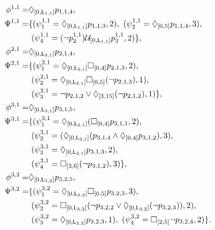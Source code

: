 \documentclass[journal,twoside,web]{IEEEtran}
\newcommand{\Len}{{\sf L}}
\newcommand{\U}[1]{\mathcal{U}_{[#1]}}
\newcommand{\F}[1]{\Diamond_{[#1]}}
\newcommand{\G}[1]{\Box_{[#1]}}
\begin{document}
%
\begin{align}
\phi^{1,1}=&\F{0,\Len_{1,1}}p_{1,1,4},\notag \\
\Psi^{1,1} 
=&\{
(\psi^{1,1}_1 =\F{0,\Len_{1,1}}p_{1,1,3}, 2),~
(\psi^{1,1}_2 =\F{0,5}p_{1,1,4},3),\notag\\
&~(\psi^{1,1}_4 =(\lnot p_2^{1,1}) \U{0,\Len_{1,1}}p_3^{1,1}, 2)
\} ,\notag
\\
%
%
\phi^{2,1}=&\F{0,\Len_{2,1}}p_{2,1,4},\notag \\
\Psi^{2,1} 
=&\{
(\psi^{2,1}_1=\F{0,\Len_{2,1}}\G{0,4}p_{2,1,3},2),\notag \\&~
(\psi^{2,1}_2=\F{0,\Len_{2,1}}\G{0,5}(\lnot p_{2,1,3}),1),\notag\\&~
(\psi^{2,1}_3= \lnot p_{2,1,2} \lor \F{3,15}(\lnot p_{2,1,2}),1)
\},\notag
\\ %
\phi^{3,1}=&\F{0,\Len_{3,1}}p_{3,1,5},\notag \\
\Psi^{3,1} 
=&\{
(\psi^{3,1}_1=\F{0,\Len_{3,1}}(\G{0,4}p_{3,1,1}, 2),\notag \\
&~(\psi^{3,1}_2=(\F{0,\Len_{3,1}}(p_{3,1,4}\land \F{0,4}p_{3,1,2}), 3),\notag \\
&~(\psi^{3,1}_3=\F{0,\Len_{3,1}}p_{3,1,3}, 2),\notag \\
&~
(\psi^{3,1}_4=\G{3,6}(\lnot p_{3,1,2}), 3)
\} ,
\notag \\
\phi^{3,2}=&\F{0,\Len_{3,2}}p_{3,2,5} ,\notag \\
\Psi^{3,2} 
=&\{
(\psi^{3,2}_1=\F{0,\Len_{3,2}}\G{0,5}p_{3,2,3}, 3),\notag \\
&~
(\psi^{3,2}_2=\G{0,\Len_{3,2}}(\lnot p_{3,2,2}\lor\F{0,\Len_{3,2}}(\lnot p_{3,2,3})), 2),\notag \\
&~(\psi^{3,2}_3=\F{0,\Len_{3,2}}p_{3,2,3}, 1),~
(\psi^{3,2}_4=\G{2,5}\lnot p_{3,2,4}, 2)\}
 .\notag
\end{align}
%
%
%
\end{document}
